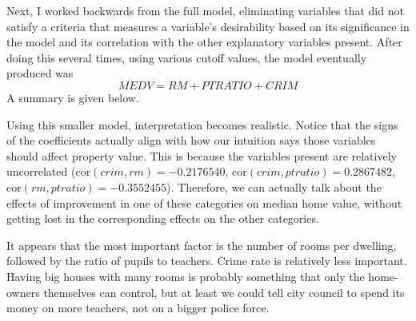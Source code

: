 \documentclass[12pt]{article}
\begin{document}
Next, I worked backwards from the full model, eliminating variables that did not satisfy a criteria that measures a variable's desirability based on its significance in the model and its correlation with the other explanatory variables present.  After doing this several times, using various cutoff values, the model eventually produced was
$$
MEDV = RM + PTRATIO + CRIM
$$
A summary is given below.



Using this smaller model, interpretation becomes realistic.  Notice that the signs of the coefficients actually align with how our intuition says those variables should affect property value.  This is because the variables present are relatively uncorrelated (cor$(crim,rm) = -0.2176540$, cor$(crim,ptratio) = 0.2867482$, cor$(rm,ptratio) = -0.3552455$).  Therefore, we can actually talk about the effects of improvement in one of these categories on median home value, without getting lost in the corresponding effects on the other categories.  

It appears that the most important factor is the number of rooms per dwelling, followed by the ratio of pupils to teachers.  Crime rate is relatively less important.  Having big houses with many rooms is probably something that only the home-owners themselves can control, but at least we could tell city council to spend its money on more teachers, not on a bigger police force.

\end{document}
